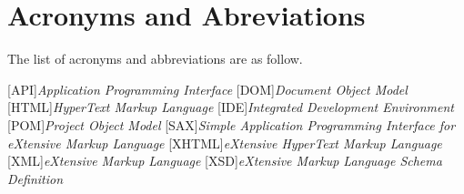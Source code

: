 \chapter*{Acronyms and Abreviations} \label{chap:acronyms}

The list of acronyms and abbreviations are as follow. \\

\begin{acronym}[Z] 

[API]{\emph{Application Programming Interface}}
[DOM]{\emph{Document Object Model}}
[HTML]{\emph{HyperText Markup Language}}
[IDE]{\emph{Integrated Development Environment}}
[POM]{\emph{Project Object Model}}
[SAX]{\emph{Simple Application Programming Interface for eXtensive Markup Language}}
[XHTML]{\emph{eXtensive HyperText Markup Language}}
[XML]{\emph{eXtensive Markup Language}}
[XSD]{\emph{eXtensive Markup Language Schema Definition}}

\end{acronym}


